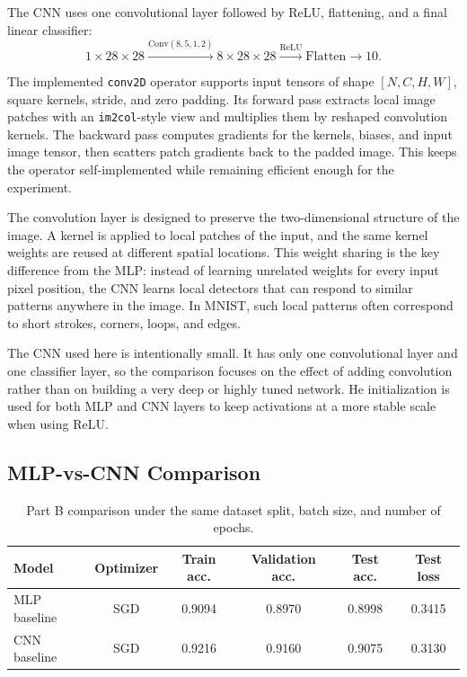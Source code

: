 \documentclass[11pt]{article}
\begin{document}
The CNN uses one convolutional layer followed by ReLU, flattening, and a final linear classifier:
\[
1 \times 28 \times 28 \xrightarrow{\mathrm{Conv}(8,5,1,2)} 8 \times 28 \times 28
\xrightarrow{\mathrm{ReLU}} \mathrm{Flatten} \rightarrow 10.
\]

The implemented \texttt{conv2D} operator supports input tensors of shape $[N,C,H,W]$, square kernels, stride, and zero padding. Its forward pass extracts local image patches with an \texttt{im2col}-style view and multiplies them by reshaped convolution kernels. The backward pass computes gradients for the kernels, biases, and input image tensor, then scatters patch gradients back to the padded image. This keeps the operator self-implemented while remaining efficient enough for the experiment.

The convolution layer is designed to preserve the two-dimensional structure of the image. A kernel is applied to local patches of the input, and the same kernel weights are reused at different spatial locations. This weight sharing is the key difference from the MLP: instead of learning unrelated weights for every input pixel position, the CNN learns local detectors that can respond to similar patterns anywhere in the image. In MNIST, such local patterns often correspond to short strokes, corners, loops, and edges.

The CNN used here is intentionally small. It has only one convolutional layer and one classifier layer, so the comparison focuses on the effect of adding convolution rather than on building a very deep or highly tuned network. He initialization is used for both MLP and CNN layers to keep activations at a more stable scale when using ReLU.

\subsection{MLP-vs-CNN Comparison}

\begin{table}[H]
\centering
\caption{Part B comparison under the same dataset split, batch size, and number of epochs.}
\label{tab:cnn-comparison}
\begin{tabular}{lccccc}
\toprule
Model & Optimizer & Train acc. & Validation acc. & Test acc. & Test loss \\
\midrule
MLP baseline & SGD & 0.9094 & 0.8970 & 0.8998 & 0.3415 \\
CNN baseline & SGD & 0.9216 & 0.9160 & 0.9075 & 0.3130 \\
\bottomrule
\end{tabular}
\end{table}
\end{document}
